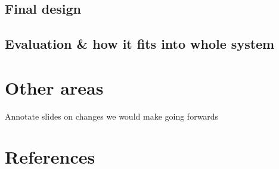 \documentclass{article}
\begin{document}
\subsection{Final design}\label{ssec:app-final-design}

\subsection{Evaluation \& how it fits into whole system}\label{ssec:app-evaluation}

\section{Other areas}\label{sec:other}

Annotate slides on changes we would make going forwards
\section{References}\label{sec:references}

\end{document}
